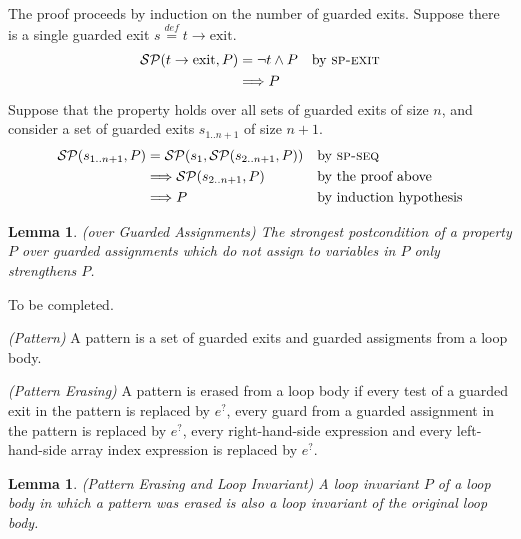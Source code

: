 \documentclass[a4paper,10pt]{article}
\newcommand{\yannick}[1]{{\color{red} #1}}
\newcommand{\KWexit}{\ensuremath{\mathrm{exit}}}
\newcommand{\impl}{\ensuremath{\Longrightarrow}}
\newcommand{\symdef}{\ensuremath{\overset{\mathit{def}}{=}}}
\newcommand{\spexit}{\textsc{sp-exit}\xspace}
\newcommand{\spseq}{\textsc{sp-seq}\xspace}
\newtheorem{lemma}[theorem]{Lemma}
\newenvironment{proof}[1][Proof.]{\begin{trivlist}
\item[\hskip \labelsep {\bfseries #1}]}{\end{trivlist}}
\newenvironment{definition}[1][Definition]{\begin{trivlist}
\item[\hskip \labelsep {\bfseries #1}]}{\end{trivlist}}
\begin{document}
\begin{proof}
  The proof proceeds by induction on the number of guarded exits. Suppose there
  is a single guarded exit $s \symdef t \rightarrow \KWexit$.
  \begin{align*}
    \spost{t \rightarrow \KWexit}{P} 
    &= \neg t \land P && \text{by \spexit}\\
    &\impl P
  \end{align*}
  Suppose that the property holds over all sets of guarded exits of size $n$,
  and consider a set of guarded exits $s_{1..n+1}$ of size $n+1$.
  \begin{align*}
    \spost{s_{1..n+1}}{P} 
    &= \spost{s_1}{\spost{s_{2..n+1}}{P}}  && \text{by \spseq}\\
    &\impl \spost{s_{2..n+1}}{P}           && \text{by the proof above}\\
    &\impl P                             && \text{by induction hypothesis}\\
  \end{align*}
\end{proof}

\begin{lemma}
  \emph{(\spostsym over Guarded Assignments)} The strongest postcondition of a
  property $P$ over guarded assignments which do not assign to variables in $P$
  only strengthens $P$.
\label{lemma:sp-guarded-assignments}
\end{lemma}

\begin{proof}
  \yannick{To be completed.}
\end{proof}

\begin{definition}
  \emph{(Pattern)} A pattern is a set of guarded exits and guarded assigments
  from a loop body.
\end{definition}

\begin{definition}
  \emph{(Pattern Erasing)} A pattern is erased from a loop body if every test
  of a guarded exit in the pattern is replaced by $e^?$, every guard from a
  guarded assignment in the pattern is replaced by $e^?$, every right-hand-side
  expression and every left-hand-side array index expression is replaced by
  $e^?$.
\end{definition}

\begin{lemma}
  \emph{(Pattern Erasing and Loop Invariant)} A loop invariant $P$ of a loop
  body in which a pattern was erased is also a loop invariant of the original
  loop body.
\end{lemma}
\end{document}
